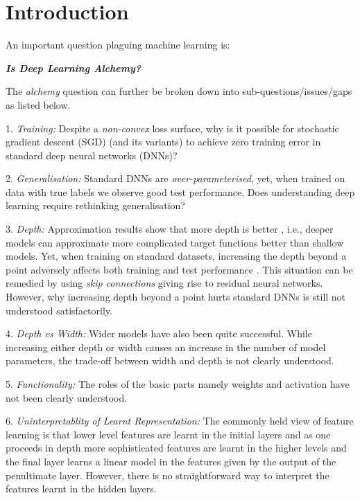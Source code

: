 \section{Introduction}\label{sec:intro}
An important question plaguing machine learning \cite{BenAli-1,Lecun,BenAli-2,Aliresponse,Mickens} is:
\begin{center}
\textbf{\emph{Is Deep Learning Alchemy?}}
\end{center}
The \emph{alchemy} question can further be broken down into sub-questions/issues/gaps as listed below. 

1. \emph{Training:} Despite a \emph{non-convex} loss surface, why is it possible for stochastic gradient descent (SGD) (and its variants) to achieve zero training error in standard deep neural networks (DNNs)?

2. \emph{Generalisation:} Standard DNNs are \emph{over-parameterised}, yet, when trained on data with true labels we observe good test performance. Does understanding deep learning require rethinking generalisation? \cite{ben}

3. \emph{Depth:} Approximation results show that more depth is better \cite{depth1,depth2}, i.e., deeper models can approximate more complicated target functions better than shallow models. Yet, when training on standard datasets, increasing the depth beyond a point adversely affects both training and test performance \cite{resnets}. This situation can be remedied by using \emph{skip connections} giving rise to residual neural networks. However, why increasing depth beyond a point hurts standard DNNs is still not understood satisfactorily. 

4. \emph{Depth vs Width:} Wider models \cite{wide1,wide2,wide3} have also been quite successful. While increasing either depth or width causes an increase in the number of model parameters, the trade-off between width and depth is not clearly understood.

5. \emph{Functionality:} The roles of the basic parts namely weights and activation have not been clearly understood.

6. \emph{Uninterpretablity of Learnt Representation:} The commonly held view of feature learning is that lower level features are learnt in the initial layers and as one proceeds in depth more sophisticated features are learnt in the higher levels and the final layer learns a linear model in the features given by the output of the penultimate layer. However, there is no straightforward way to interpret the features learnt in the hidden layers.

